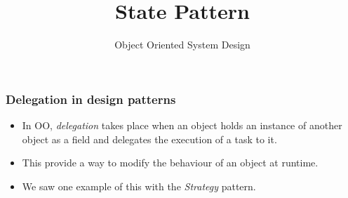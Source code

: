 \documentclass[10pt]{beamer}
\title{State Pattern}
\author[IN710]{Object Oriented System Design}
\institute[Otago Polytechnic]{
  Otago Polytechnic \\
  Dunedin, New Zealand \\
}
\date{}
\begin{document}
\begin{frame}[plain]
  \titlepage
\end{frame}

\begin{frame}
	\frametitle{Delegation in design patterns}
        \begin{itemize}
		\item In OO, \emph{delegation} takes place when an object
	holds an instance of another object as a field and 
	delegates the execution of a task to it.
        \item This provide a way to modify the behaviour of an object
	at runtime.
        \item We saw one example of this with the \emph{Strategy} pattern.
	\end{itemize}

\end{frame}
\end{document}
